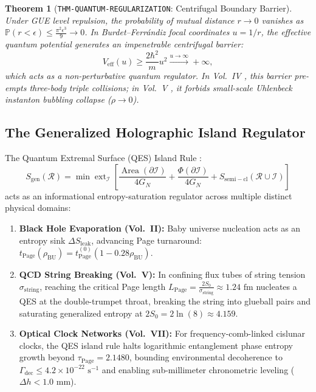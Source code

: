 \documentclass[11pt,a4paper,reqno]{article}
\theoremstyle{plain}
\newtheorem{theorem}{Theorem}[section]
\theoremstyle{definition}
\theoremstyle{remark}
\numberwithin{equation}{section}
\numberwithin{table}{section}
\begin{document}
\begin{theorem}[\texttt{THM-QUANTUM-REGULARIZATION}: Centrifugal Boundary Barrier]
\label{thm:quantum_centrifugal_barrier}
Under GUE level repulsion, the probability of mutual distance $r \to 0$ vanishes as $\mathbb{P}(r < \epsilon) \le \frac{\pi^2 \epsilon^3}{9} \to 0$. In Burdet--Ferr\'andiz focal coordinates $u = 1/r$, the effective quantum potential generates an impenetrable centrifugal barrier:
\begin{equation}
  V_{\mathrm{eff}}(u) \ge \frac{2\hbar^2}{m} u^2 \xrightarrow{u \to \infty} +\infty,
  \label{eq:quantum_centrifugal_barrier}
\end{equation}
which acts as a non-perturbative \emph{quantum regulator}. In Vol.~IV \cite{RelativisticThreeBody2026}, this barrier pre-empts three-body triple collisions; in Vol.~V \cite{PuristYangMillsVol5Monograph2026}, it forbids small-scale Uhlenbeck instanton bubbling collapse ($\rho \to 0$).
\end{theorem}

\subsection{The Generalized Holographic Island Regulator}
The Quantum Extremal Surface (QES) Island Rule \cite{Almheiri2020}:
\begin{equation}
  S_{\mathrm{gen}}(\mathcal{R}) = \min \operatorname{ext}_{\mathcal{I}} \left[ \frac{\operatorname{Area}(\partial \mathcal{I})}{4 G_N} + \frac{\Phi(\partial \mathcal{I})}{4 G_N} + S_{\mathrm{semi-cl}}(\mathcal{R} \cup \mathcal{I}) \right]
  \label{eq:island_rule_master}
\end{equation}
acts as an informational entropy-saturation regulator across multiple distinct physical domains:
\begin{enumerate}[label=(\alph*)]
  \item \textbf{Black Hole Evaporation (Vol.~II):} Baby universe nucleation acts as an entropy sink $\Delta S_{\mathrm{leak}}$, advancing Page turnaround: $t_{\mathrm{Page}}(\rho_{\mathrm{BU}}) = t_{\mathrm{Page}}^{(0)}(1 - 0.28\rho_{\mathrm{BU}})$.
  \item \textbf{QCD String Breaking (Vol.~V):} In confining flux tubes of string tension $\sigma_{\mathrm{string}}$, reaching the critical Page length $L_{\mathrm{Page}} = \frac{2S_0}{\sigma_{\mathrm{string}}} \approx 1.24\text{ fm}$ nucleates a QES at the double-trumpet throat, breaking the string into glueball pairs and saturating generalized entropy at $2S_0 = 2\ln(8) \approx 4.159$.
  \item \textbf{Optical Clock Networks (Vol.~VII):} For frequency-comb-linked cislunar clocks, the QES island rule halts logarithmic entanglement phase entropy growth beyond $\tau_{\mathrm{Page}} = 2.1480$, bounding environmental decoherence to $\Gamma_{\mathrm{dec}} \le 4.2 \times 10^{-22}\text{ s}^{-1}$ and enabling sub-millimeter chronometric leveling ($\Delta h < 1.0\text{ mm}$).
\end{enumerate}
\end{document}
